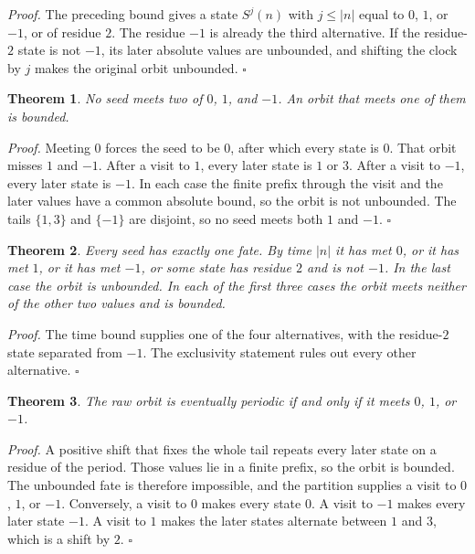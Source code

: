 \documentclass[11pt,letterpaper]{article}
\newtheorem{theorem}{Theorem}
\newenvironment{proof}{\noindent\textit{Proof.}}{\hfill\(\square\)}
\begin{document}
\begin{proof}
The preceding bound gives a state \(S^{j}(n)\) with \(j\le |n|\) equal to \(0\), \(1\), or \(-1\), or of residue \(2\). The residue \(-1\) is already the third alternative. If the residue-\(2\) state is not \(-1\), its later absolute values are unbounded, and shifting the clock by \(j\) makes the original orbit unbounded.
\end{proof}

\begin{theorem}
\label{thm:fateexclusive}
No seed meets two of \(0\), \(1\), and \(-1\). An orbit that meets one of them is bounded.
\end{theorem}

\begin{proof}
Meeting \(0\) forces the seed to be \(0\), after which every state is \(0\). That orbit misses \(1\) and \(-1\). After a visit to \(1\), every later state is \(1\) or \(3\). After a visit to \(-1\), every later state is \(-1\). In each case the finite prefix through the visit and the later values have a common absolute bound, so the orbit is not unbounded. The tails \(\{1,3\}\) and \(\{-1\}\) are disjoint, so no seed meets both \(1\) and \(-1\).
\end{proof}

\begin{theorem}
\label{thm:fatepartition}
Every seed has exactly one fate. By time \(|n|\) it has met \(0\), or it has met \(1\), or it has met \(-1\), or some state has residue \(2\) and is not \(-1\). In the last case the orbit is unbounded. In each of the first three cases the orbit meets neither of the other two values and is bounded.
\end{theorem}

\begin{proof}
The time bound supplies one of the four alternatives, with the residue-\(2\) state separated from \(-1\). The exclusivity statement rules out every other alternative.
\end{proof}

\begin{theorem}
\label{thm:periodic}
The raw orbit is eventually periodic if and only if it meets \(0\), \(1\), or \(-1\).
\end{theorem}

\begin{proof}
A positive shift that fixes the whole tail repeats every later state on a residue of the period. Those values lie in a finite prefix, so the orbit is bounded. The unbounded fate is therefore impossible, and the partition supplies a visit to \(0\), \(1\), or \(-1\). Conversely, a visit to \(0\) makes every state \(0\). A visit to \(-1\) makes every later state \(-1\). A visit to \(1\) makes the later states alternate between \(1\) and \(3\), which is a shift by \(2\).
\end{proof}
\end{document}
